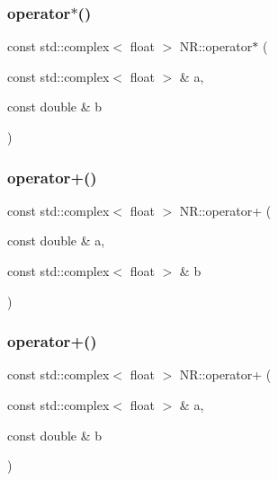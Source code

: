 \mbox{\label{namespaceNR_a39e0a171e9227121881368e4c636fd97}} 
\subsubsection{\texorpdfstring{operator$\ast$()}{operator*()}\hspace{0.1cm}{\footnotesize\ttfamily [2/2]}}
{\footnotesize\ttfamily const std\+::complex$<$ float $>$ N\+R\+::operator$\ast$ (\begin{DoxyParamCaption}\item[{const std\+::complex$<$ float $>$ \&}]{a,  }\item[{const double \&}]{b }\end{DoxyParamCaption})\hspace{0.3cm}{\ttfamily [inline]}}

\mbox{\label{namespaceNR_ad2f255483b92a41caf84daa8e4fb4f2d}} 
\subsubsection{\texorpdfstring{operator+()}{operator+()}\hspace{0.1cm}{\footnotesize\ttfamily [1/2]}}
{\footnotesize\ttfamily const std\+::complex$<$ float $>$ N\+R\+::operator+ (\begin{DoxyParamCaption}\item[{const double \&}]{a,  }\item[{const std\+::complex$<$ float $>$ \&}]{b }\end{DoxyParamCaption})\hspace{0.3cm}{\ttfamily [inline]}}

\mbox{\label{namespaceNR_a248dbe3651d0e72fea48fde8c29d03c1}} 
\subsubsection{\texorpdfstring{operator+()}{operator+()}\hspace{0.1cm}{\footnotesize\ttfamily [2/2]}}
{\footnotesize\ttfamily const std\+::complex$<$ float $>$ N\+R\+::operator+ (\begin{DoxyParamCaption}\item[{const std\+::complex$<$ float $>$ \&}]{a,  }\item[{const double \&}]{b }\end{DoxyParamCaption})\hspace{0.3cm}{\ttfamily [inline]}}

